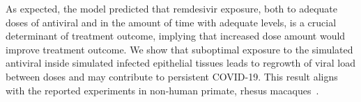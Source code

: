 

As expected, the model predicted that remdesivir exposure, both to adequate doses of antiviral and in the amount of time with adequate levels, is a crucial determinant of treatment outcome, implying that increased dose amount would improve treatment outcome. We show that suboptimal exposure to the simulated antiviral inside simulated infected epithelial tissues leads to regrowth of viral load between doses and may contribute to persistent COVID-19. This result aligns with the reported experiments in non-human primate, rhesus macaques~\cite{kim2021incomplete, dobrovolny_quantifying_2020, williamson2020clinical}.

